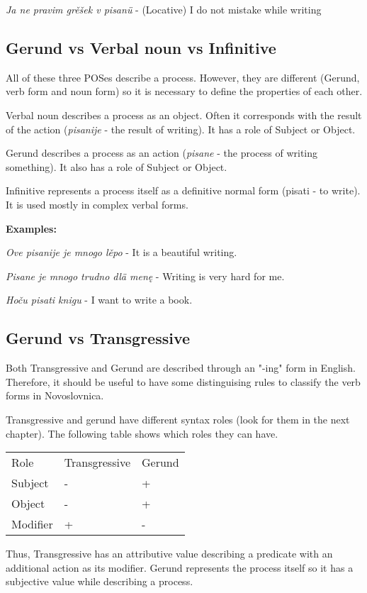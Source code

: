 \textit{Ja ne pravim grěšek v pisanü} - (Locative) I do not mistake while writing

\subsection{Gerund vs Verbal noun vs Infinitive}

All of these three POSes describe a process. However, they are different (Gerund, verb form and noun form) so it is necessary to define the properties of each other.

Verbal noun describes a process as an object. Often it corresponds with the result of the action (\textit{pisanije} - the result of writing). It has a role of Subject or Object.

Gerund describes a process as an action (\textit{pisane} - the process of writing something). It also has a role of Subject or Object.

Infinitive represents a process itself as a definitive normal form (pisati - to write). It is used mostly in complex verbal forms.

\textbf{Examples:}

\textit{Ove pisanije je mnogo lěpo} - It is a beautiful writing.

\textit{Pisane je mnogo trudno dlä menę} - Writing is very hard for me.

\textit{Hoču pisati knigu} - I want to write a book.

\subsection{Gerund vs Transgressive}

Both Transgressive and Gerund are described through an "-ing" form in English. Therefore, it should be useful to have some distinguising rules to classify the verb forms in Novoslovnica.

Transgressive and gerund have different syntax roles (look for them in the next chapter). The following table shows which roles they can have.

\begin{table}
	\begin{tabular}{lll}
		Role & Transgressive & Gerund \\
		Subject & - & + \\
		Object & - & + \\
		Modifier & + & - \\
	\end{tabular}
\end{table}

Thus, Transgressive has an attributive value describing a predicate with an additional action as its modifier. Gerund represents the process itself so it has a subjective value while describing a process.